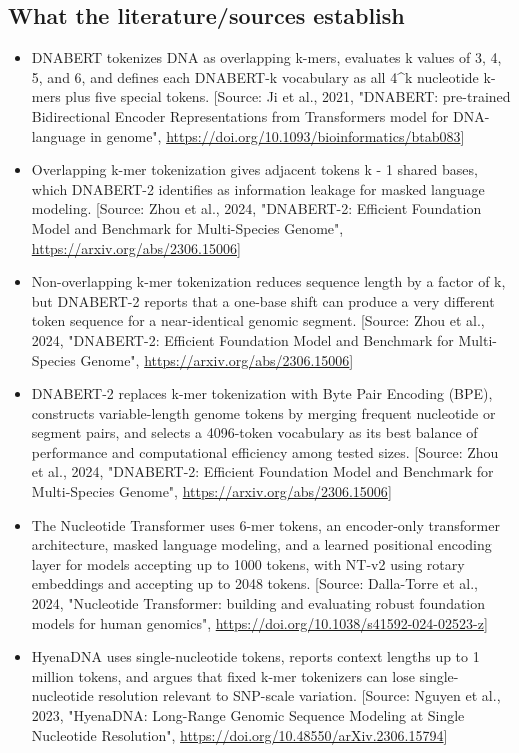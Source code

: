 \documentclass[11pt]{report}
\begin{document}
\subsection{What the literature/sources establish}
\begin{itemize}
\item DNABERT tokenizes DNA as overlapping k-mers, evaluates k values of 3, 4, 5, and 6, and defines each DNABERT-k vocabulary as all 4\textasciicircum{}k nucleotide k-mers plus five special tokens. [Source: Ji et al., 2021, "DNABERT: pre-trained Bidirectional Encoder Representations from Transformers model for DNA-language in genome", \url{https://doi.org/10.1093/bioinformatics/btab083}]
\item Overlapping k-mer tokenization gives adjacent tokens k - 1 shared bases, which DNABERT-2 identifies as information leakage for masked language modeling. [Source: Zhou et al., 2024, "DNABERT-2: Efficient Foundation Model and Benchmark for Multi-Species Genome", \url{https://arxiv.org/abs/2306.15006}]
\item Non-overlapping k-mer tokenization reduces sequence length by a factor of k, but DNABERT-2 reports that a one-base shift can produce a very different token sequence for a near-identical genomic segment. [Source: Zhou et al., 2024, "DNABERT-2: Efficient Foundation Model and Benchmark for Multi-Species Genome", \url{https://arxiv.org/abs/2306.15006}]
\item DNABERT-2 replaces k-mer tokenization with Byte Pair Encoding (BPE), constructs variable-length genome tokens by merging frequent nucleotide or segment pairs, and selects a 4096-token vocabulary as its best balance of performance and computational efficiency among tested sizes. [Source: Zhou et al., 2024, "DNABERT-2: Efficient Foundation Model and Benchmark for Multi-Species Genome", \url{https://arxiv.org/abs/2306.15006}]
\item The Nucleotide Transformer uses 6-mer tokens, an encoder-only transformer architecture, masked language modeling, and a learned positional encoding layer for models accepting up to 1000 tokens, with NT-v2 using rotary embeddings and accepting up to 2048 tokens. [Source: Dalla-Torre et al., 2024, "Nucleotide Transformer: building and evaluating robust foundation models for human genomics", \url{https://doi.org/10.1038/s41592-024-02523-z}]
\item HyenaDNA uses single-nucleotide tokens, reports context lengths up to 1 million tokens, and argues that fixed k-mer tokenizers can lose single-nucleotide resolution relevant to SNP-scale variation. [Source: Nguyen et al., 2023, "HyenaDNA: Long-Range Genomic Sequence Modeling at Single Nucleotide Resolution", \url{https://doi.org/10.48550/arXiv.2306.15794}]

\end{itemize}
\end{document}
